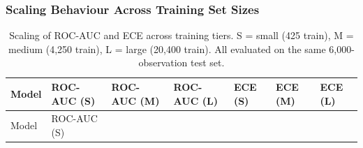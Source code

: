 \documentclass[
  letterpaper,
  DIV=11,
  numbers=noendperiod]{scrartcl}
\begin{document}
\subsubsection{Scaling Behaviour Across Training Set
Sizes}\label{sec-uci-scaling}

\begin{longtable}[]{@{}
  >{\raggedright\arraybackslash}p{}
  >{\centering\arraybackslash}p{}
  >{\centering\arraybackslash}p{}
  >{\centering\arraybackslash}p{}
  >{\centering\arraybackslash}p{}
  >{\centering\arraybackslash}p{}
  >{\centering\arraybackslash}p{}@{}}
\caption{Scaling of ROC-AUC and ECE across training tiers. S = small
(425 train), M = medium (4,250 train), L = large (20,400 train). All
evaluated on the same 6,000-observation test
set.}\label{tbl-uci-scaling}\tabularnewline
\toprule\noalign{}
\begin{minipage}[b]{\linewidth}\raggedright
Model
\end{minipage} & \begin{minipage}[b]{\linewidth}\centering
ROC-AUC (S)
\end{minipage} & \begin{minipage}[b]{\linewidth}\centering
ROC-AUC (M)
\end{minipage} & \begin{minipage}[b]{\linewidth}\centering
ROC-AUC (L)
\end{minipage} & \begin{minipage}[b]{\linewidth}\centering
ECE (S)
\end{minipage} & \begin{minipage}[b]{\linewidth}\centering
ECE (M)
\end{minipage} & \begin{minipage}[b]{\linewidth}\centering
ECE (L)
\end{minipage} \\
\midrule\noalign{}
\endfirsthead
\toprule\noalign{}
\begin{minipage}[b]{\linewidth}\raggedright
Model
\end{minipage} & \begin{minipage}[b]{\linewidth}\centering
ROC-AUC (S)
\end{minipage} & \begin{minipage}[b]{\linewidth}\centering

\end{minipage}
\end{longtable}
\end{document}
